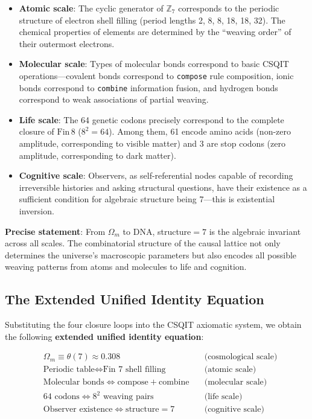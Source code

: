 \documentclass[aps,prd,twocolumn,nofootinbib,floatfix]{revtex4-2}
\begin{document}
\begin{itemize}
    \item \textbf{Atomic scale}: The cyclic generator of $\mathbb{Z}_7$ corresponds to the periodic structure of electron shell filling (period lengths 2, 8, 8, 18, 18, 32). The chemical properties of elements are determined by the ``weaving order'' of their outermost electrons.
    \item \textbf{Molecular scale}: Types of molecular bonds correspond to basic CSQIT operations---covalent bonds correspond to \texttt{compose} rule composition, ionic bonds correspond to \texttt{combine} information fusion, and hydrogen bonds correspond to weak associations of partial weaving.
    \item \textbf{Life scale}: The 64 genetic codons precisely correspond to the complete closure of $\text{Fin}\,8$ ($8^2 = 64$). Among them, 61 encode amino acids (non-zero amplitude, corresponding to visible matter) and 3 are stop codons (zero amplitude, corresponding to dark matter).
    \item \textbf{Cognitive scale}: Observers, as self-referential nodes capable of recording irreversible histories and asking structural questions, have their existence as a sufficient condition for algebraic structure being 7---this is existential inversion.
\end{itemize}

\textbf{Precise statement}: From $\Omega_m$ to DNA, structure$=7$ is the algebraic invariant across all scales. The combinatorial structure of the causal lattice not only determines the universe's macroscopic parameters but also encodes all possible weaving patterns from atoms and molecules to life and cognition.

\subsection{The Extended Unified Identity Equation}

Substituting the four closure loops into the CSQIT axiomatic system, we obtain the following \textbf{extended unified identity equation}:

\[
\boxed{
\begin{aligned}
&\Omega_m \equiv \theta(7) \approx 0.308 \quad &\text{(cosmological scale)} \\
&\text{Periodic table} \iff \text{Fin 7 shell filling} \quad &\text{(atomic scale)} \\
&\text{Molecular bonds} \iff \text{compose} + \text{combine} \quad &\text{(molecular scale)} \\
&64\text{ codons} \iff 8^2\text{ weaving pairs} \quad &\text{(life scale)} \\
&\text{Observer existence} \iff \text{structure}=7 \quad &\text{(cognitive scale)}
\end{aligned}
}
\]
\end{document}
